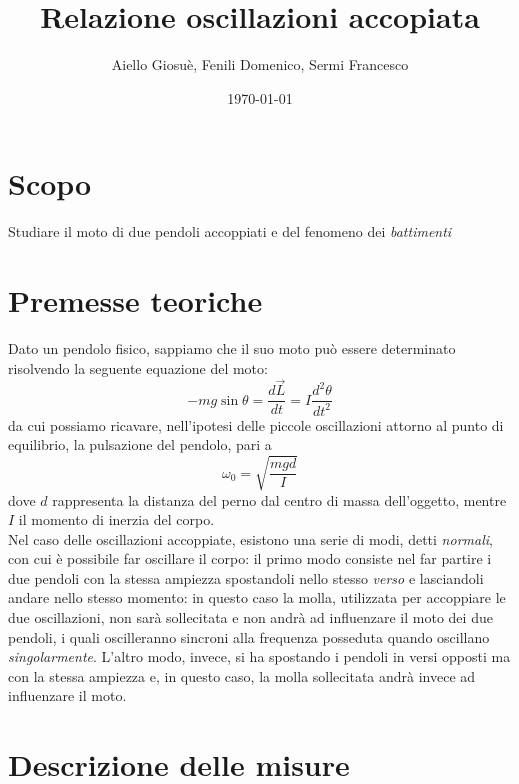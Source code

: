 \documentclass{article}
\title{Relazione oscillazioni accopiata}
\author{Aiello Giosuè, Fenili Domenico, Sermi Francesco}
\date{\today}
\begin{document}
\maketitle
\newpage
\tableofcontents

\newpage
\section{Scopo}
Studiare il moto di due pendoli accoppiati e del fenomeno dei \emph{battimenti}
\section{Premesse teoriche}
Dato un pendolo fisico, sappiamo che il suo moto può essere determinato risolvendo la seguente equazione del moto:
\begin{equation}
	-mg\sin{\theta} = \frac{d\vec{L}}{dt} = I\frac{d^2 \theta}{dt^2}
\end{equation}
da cui possiamo ricavare, nell'ipotesi delle piccole oscillazioni attorno al punto di equilibrio, la pulsazione del pendolo, pari a
\begin{equation}
	\omega_0 = \sqrt{\frac{mgd}{I}}
\end{equation}
dove $d$ rappresenta la distanza del perno dal centro di massa dell'oggetto, mentre $I$ il momento di inerzia del corpo. \\
Nel caso delle oscillazioni accoppiate, esistono una serie di modi, detti \emph{normali}, con cui è possibile far oscillare il corpo: il primo modo consiste nel far partire i due pendoli con la stessa ampiezza spostandoli nello stesso \emph{verso} e lasciandoli andare nello stesso momento: in questo caso la molla, utilizzata per accoppiare le due oscillazioni, non sarà sollecitata e non andrà ad influenzare il moto dei due pendoli, i quali oscilleranno sincroni alla frequenza posseduta quando oscillano \emph{singolarmente}. L'altro modo, invece, si ha spostando i pendoli in versi opposti ma con la stessa ampiezza e, in questo caso, la molla sollecitata andrà invece ad influenzare il moto.
\section{Descrizione delle misure}
\end{document}
